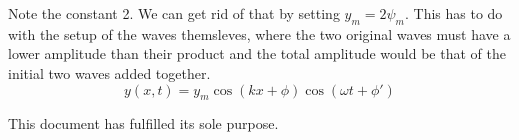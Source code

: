 \documentclass[12pt]{article}
\begin{document}
    Note the constant 2.
    We can get rid of that by setting $y_m = 2\psi_m$.
    This has to do with the setup of the waves themsleves, where the two original waves must have a lower amplitude than their product and the total amplitude would be that of the initial two waves added together.
    \begin{equation}
        y(x,t)  =   y_m \cos(kx + \phi)\cos(\omega t + \phi')
    \end{equation}

    This document has fulfilled its sole purpose.
\end{document}

